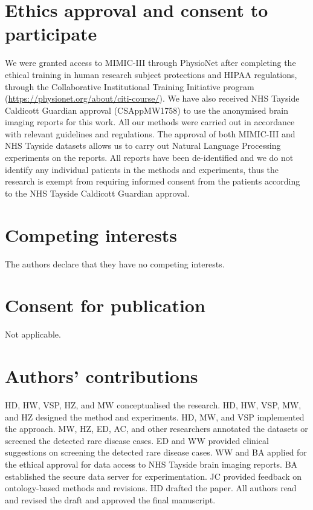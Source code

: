 \documentclass[twocolumn]{bmcart}
\begin{document}
\begin{backmatter}
\section*{Ethics approval and consent to participate}We were granted access to MIMIC-III through PhysioNet after completing the ethical training in human research subject protections and HIPAA regulations, through the Collaborative Institutional Training Initiative program (\url{https://physionet.org/about/citi-course/}). We have also received NHS Tayside Caldicott Guardian approval (CSAppMW1758) to use the anonymised brain imaging reports for this work. All our methods were carried out in accordance with relevant guidelines and regulations. The approval of both MIMIC-III and NHS Tayside datasets allows us to carry out Natural Language Processing experiments on the reports. All reports have been de-identified and we do not identify any individual patients in the methods and experiments, thus the research is exempt from requiring informed consent from the patients according to the NHS Tayside Caldicott Guardian approval. 

\section*{Competing interests}
The authors declare that they have no competing interests.

\section*{Consent for publication}
Not applicable.

\section*{Authors' contributions}
HD, HW, VSP, HZ, and MW conceptualised the research. HD, HW, VSP, MW, and HZ designed the method and experiments. HD, MW, and VSP implemented the approach. MW, HZ, ED, AC, and other researchers annotated the datasets or screened the detected rare disease cases. ED and WW provided clinical suggestions on screening the detected rare disease cases. WW and BA applied for the ethical approval for data access to NHS Tayside brain imaging reports. BA established the secure data server for experimentation. JC provided feedback on ontology-based methods and revisions. HD drafted the paper. All authors read and revised the draft and approved the final manuscript.





\end{backmatter}
\end{document}
